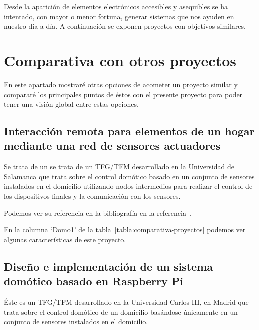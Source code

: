 \begin{comment}
\capitulo{6}{Trabajos relacionados}
Este apartado sería parecido a un estado del arte de una tesis o tesina. En un trabajo final grado no parece obligada su presencia, aunque se puede dejar a juicio del tutor el incluir un pequeño resumen comentado de los trabajos y proyectos ya realizados en el campo del proyecto en curso. 
\end{comment}

Desde la aparición de elementos electrónicos accesibles y asequibles se ha intentado, con mayor o menor fortuna, generar sistemas que nos ayuden en nuestro día a día. A continuación se exponen proyectos con objetivos similares.

\section{Comparativa con otros proyectos}
En este apartado mostraré otras opciones de acometer un proyecto similar y compararé los principales puntos de éstos con el presente proyecto para poder tener una visión global entre estas opciones.

\subsection{Interacción remota para elementos de un hogar mediante una red de sensores actuadores}\label{Proy_Domo_1}
Se trata de un  se trata de un TFG/TFM desarrollado en la Universidad de Salamanca que trata sobre el control domótico basado en un conjunto de sensores instalados en el domicilio utilizando nodos intermedios para realizar el control de los dispositivos finales y la comunicación con los sensores.

Podemos ver su referencia en la bibliografía en la referencia~\cite{misc:TFG_Salamanca}.

En la columna `Domo1' de la tabla~\ref{tabla:comparativa-proyectos} podemos ver algunas características de este proyecto.

\subsection{Diseño e implementación de un sistema domótico basado en Raspberry Pi}\label{Proy_Domo_2}
Éste es un TFG/TFM desarrollado en la Universidad Carlos III, en Madrid que trata sobre el control domótico de un domicilio basándose únicamente en un conjunto de sensores instalados en el domicilio.

